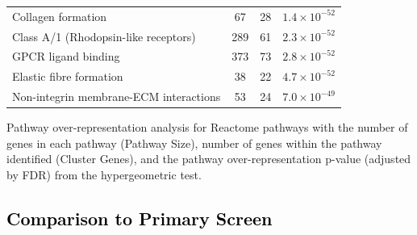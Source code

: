 \begin{table}[!htb]
{\begin{threeparttable}
\begin{tabular}{lccc}
  \rowcolor{Cluster_Red!15}
  Collagen formation &  67 &  28 & $1.4 \times 10^{-52}$ \\ 
  \rowcolor{Cluster_Red!20}
  Class A/1 (Rhodopsin-like receptors) & 289 &  61 & $2.3 \times 10^{-52}$ \\ 
  \rowcolor{Cluster_Red!15}
  GPCR ligand binding & 373 &  73 & $2.8 \times 10^{-52}$ \\ 
  \rowcolor{Cluster_Red!20}
  Elastic fibre formation &  38 &  22 & $4.7 \times 10^{-52}$ \\ 
  \rowcolor{Cluster_Red!15}
  Non-integrin membrane-ECM interactions &  53 &  24 & $7.0 \times 10^{-49}$ \\ 
 \hline
\end{tabular}
\begin{tablenotes}
\raggedright %
Pathway over-representation analysis for Reactome pathways with the number of genes in each pathway (Pathway Size), number of genes within the pathway identified (Cluster Genes), and the pathway over-representation p-value (adjusted by \gls{FDR}) from the hypergeometric test.  
\end{tablenotes}
\end{threeparttable}
}
\end{table}


\FloatBarrier

\subsection{\textcolor{black}{Comparison to Primary Screen}} \label{chapt3:compare_SL_genes_stad}

